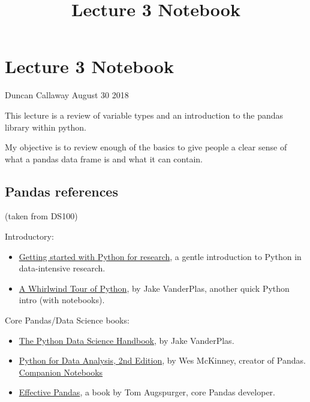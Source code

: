 \documentclass[11pt]{article}
\title{Lecture 3 Notebook}
\begin{document}
    
    
    \maketitle
    
    

    
    \section{Lecture 3 Notebook}\label{lecture-3-notebook}

Duncan Callaway August 30 2018

This lecture is a review of variable types and an introduction to the
pandas library within python.

My objective is to review enough of the basics to give people a clear
sense of what a pandas data frame is and what it can contain.

    \subsection{Pandas references}\label{pandas-references}

(taken from DS100)

Introductory:

\begin{itemize}
\item
  \href{https://github.com/TiesdeKok/LearnPythonforResearch}{Getting
  started with Python for research}, a gentle introduction to Python in
  data-intensive research.
\item
  \href{https://jakevdp.github.io/WhirlwindTourOfPython/index.html}{A
  Whirlwind Tour of Python}, by Jake VanderPlas, another quick Python
  intro (with notebooks).
\end{itemize}

Core Pandas/Data Science books:

\begin{itemize}
\item
  \href{https://jakevdp.github.io/PythonDataScienceHandbook/}{The Python
  Data Science Handbook}, by Jake VanderPlas.
\item
  \href{http://proquest.safaribooksonline.com/book/programming/python/9781491957653}{Python
  for Data Analysis, 2nd Edition}, by Wes McKinney, creator of Pandas.
  \href{https://github.com/wesm/pydata-book}{Companion Notebooks}
\item
  \href{https://github.com/TomAugspurger/effective-pandas}{Effective
  Pandas}, a book by Tom Augspurger, core Pandas developer.
\end{itemize}
\end{document}
